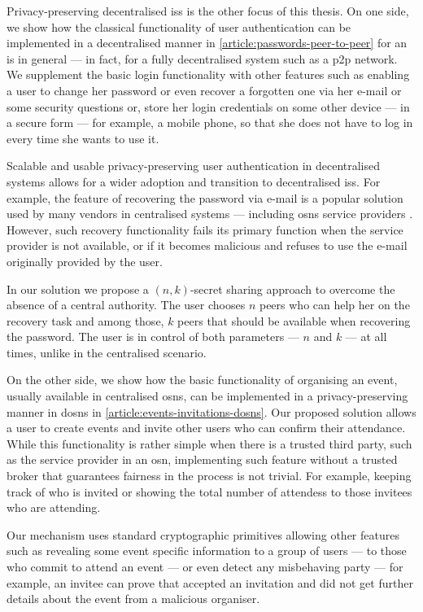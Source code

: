 \documentclass[showtrims,oldfontcommands]{kthesis}
\begin{document}
Privacy-preserving decentralised \acp{is} is the other focus of this 
thesis. On one side, we show how the classical functionality of user authentication 
can be implemented in a decentralised manner in \cref{article:passwords-peer-to-peer} 
for an \ac{is} in general --- in fact, for a fully decentralised system 
such as a \ac{p2p} network. We supplement the basic login functionality with other 
features such as enabling a user to change her password or even recover a forgotten 
one via her e-mail or some security questions or, store her login credentials on 
some other device --- in a secure form --- for example, a mobile phone, so that 
she does not have to log in every time she wants to use it.

Scalable and usable privacy-preserving user authentication in decentralised systems 
allows for a wider adoption and transition to decentralised \acp{is}. 
For example, the feature of recovering the password via e-mail is a popular solution 
used by many vendors in centralised systems --- including \acp{osn} service providers 
\cite{Kuzma11}. However, such recovery functionality fails its primary function 
when the service provider is not available, or if it becomes malicious and refuses 
to use the e-mail originally provided by the user. 

In our solution we propose a $(n, k)$-secret sharing approach to overcome the absence 
of a central authority. The user chooses $n$ peers who can help her on the recovery 
task and among those, $k$ peers that should be available when recovering the password. 
The user is in control of both parameters --- $n$ and $k$ ---  at all times, unlike 
in the centralised scenario.

On the other side, we show how the basic functionality of organising an event, usually 
available in centralised \acp{osn}, can be implemented in a privacy-preserving manner 
in \acp{dosn} in \cref{article:events-invitations-dosns}. Our proposed solution 
allows a user to create events and invite other users who can confirm their attendance. 
While this functionality is rather simple when there is a trusted third party, such as 
the service provider in an \ac{osn}, implementing such feature without a trusted 
broker that guarantees fairness in the process is not trivial. For example, keeping 
track of who is invited or showing the total number of attendess to those invitees 
who are attending.

Our mechanism uses standard cryptographic primitives allowing other features such 
as revealing some event specific information to a group of users --- to those who 
commit to attend an event --- or even detect any misbehaving party --- for example, 
an invitee can prove that accepted an invitation and did not get further details 
about the event from a malicious organiser.
\end{document}
